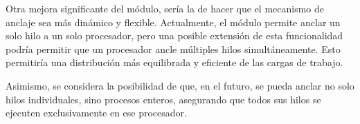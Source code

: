 Otra mejora significante del módulo, sería la de hacer que el mecanismo de anclaje sea más dinámico y flexible. Actualmente, el módulo permite anclar un solo hilo a un solo procesador, pero una posible extensión de esta funcionalidad podría permitir que un procesador ancle múltiples hilos simultáneamente. Esto permitiría una distribución más equilibrada y eficiente de las cargas de trabajo.

Asimismo, se considera la posibilidad de que, en el futuro, se pueda anclar no solo hilos individuales, sino procesos enteros, asegurando que todos sus hilos se ejecuten exclusivamente en ese procesador.